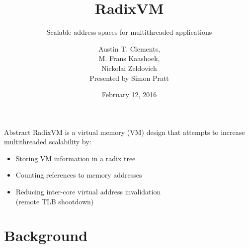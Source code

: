 \documentclass[aspectratio=169]{beamer}
\title{RadixVM}
\subtitle{Scalable address spaces for multithreaded applications}
\author[Presented by Simon Pratt]{Austin T. Clements,\\M. Frans Kaashoek,\\Nickolai Zeldovich\\
  \vspace{2em}Presented by Simon Pratt}
\date{February 12, 2016}
\newcommand{\bi}{\begin{itemize}}
\newcommand{\ei}{\end{itemize}}
\begin{document}
\frame[plain]{\titlepage}

\newpage

\begin{frame}{Abstract}
  RadixVM is a virtual memory (VM) design that attempts to increase multithreaded scalability by:
  \bi
\item Storing VM information in a radix tree
\item Counting references to memory addresses
\item Reducing inter-core virtual address invalidation\\(remote TLB shootdown)
  \ei
\end{frame}

\section{Background}
\end{document}
